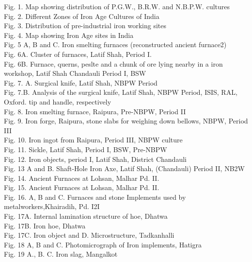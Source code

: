 \begin{myquote}
Fig. 1.  Map showing distribution of P.G.W., B.R.W. and N.B.P.W. cultures\\[.2cm]
Fig. 2.  Different Zones of Iron Age Cultures of India \\[.2cm]
Fig. 3.  Distribution of pre-industrial iron working sites\\[.2cm]
Fig. 4.  Map showing Iron Age sites in India\\[.2cm]
Fig. 5 A, B and C. Iron smelting furnaces (reconstructed ancient furnace2)\\[.2cm]
Fig. 6A.   Cluster of furnaces, Latif Shah, Period I. \\[.2cm]
Fig. 6B.   Furnace, querns, peslte and a chunk of ore lying nearby in a iron workshop, Latif Shah Chandauli Period I, BSW\\[.2cm]
Fig. 7. A.  Surgical knife, Latif Shah, NBPW Period\\[.2cm]
Fig. 7.B.  Analysis of the surgical knife, Latif Shah, NBPW Period, ISIS, RAL, Oxford. tip and handle, respectively\\[.2cm]
Fig. 8. Iron smelting furnace, Raipura, Pre-NBPW, Period II\\[.2cm]
Fig. 9.  Iron forge, Raipura, stone slabs for weighing down bellows, NBPW, Period III \\[.2cm]
Fig. 10. Iron ingot from Raipura, Period III, NBPW culture\\[.2cm]
Fig. 11. Sickle, Latif Shah, Period I, BSW, Pre-NBPW\\[.2cm]
Fig. 12. Iron  objects, period I, Latif Shah, District Chandauli \\[.2cm]
Fig. 13 A and B. Shaft-Hole Iron Axe, Latif Shah, (Chandauli) Period II, NB2W\\[.2cm]
Fig. 14.  Ancient Furnaces at Lohsan, Malhar Pd. II.\\[.2cm]
Fig. 15.  Ancient Furnaces at Lohsan, Malhar Pd. II.\\[.2cm]
Fig. 16. A, B and C. Furnaces and stone Implements used by metalworkers,Khairadih, Pd. I2I\\[.2cm]
Fig. 17A.  Internal lamination structure of hoe, Dhatwa \\[.2cm]
Fig. 17B.  Iron  hoe, Dhatwa \\[.2cm]
Fig. 17C. Iron object and D.  Microstructure, Tadkanhalli \\[.2cm]
Fig. 18 A, B and C.  Photomicrograph of Iron implements, Hatigra \\[.2cm]
Fig. 19 A., B. C.  Iron slag, Mangalkot \\[.2cm]

\end{myquote}
